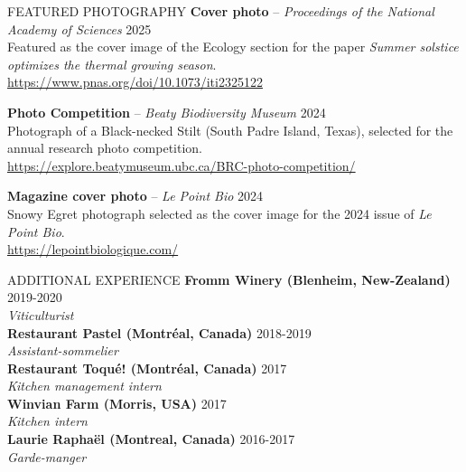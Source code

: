 \documentclass[
	11pt, %
]{resume} %
\begin{document}
\begin{rSection}{FEATURED PHOTOGRAPHY}
  \textbf{Cover photo} – \textit{Proceedings of the National Academy of Sciences} \hfill 2025 \\
  Featured as the cover image of the Ecology section for the paper \textit{Summer solstice optimizes the thermal growing season}.\\
  \href{https://www.pnas.org/doi/10.1073/iti2325122#sec-4}{https://www.pnas.org/doi/10.1073/iti2325122}

  \textbf{Photo Competition} – \textit{Beaty Biodiversity Museum} \hfill 2024 \\
  Photograph of a Black-necked Stilt (South Padre Island, Texas), selected for the annual research photo competition. \\
  \href{https://explore.beatymuseum.ubc.ca/BRC-photo-competition/25/entries/Christophe-Rouleu-Desrochers/}{https://explore.beatymuseum.ubc.ca/BRC-photo-competition/}

  \textbf{Magazine cover photo} – \textit{Le Point Bio} \hfill 2024 \\
  Snowy Egret photograph selected as the cover image for the 2024 issue of \textit{Le Point Bio}.\\
  \href{https://lepointbiologique.com/wp-content/uploads/2024/04/le_point_bio_2024_numerique.pdf}{https://lepointbiologique.com/}
\end{rSection}

\begin{rSection}{ADDITIONAL EXPERIENCE}
	\textbf{Fromm Winery (Blenheim, New-Zealand)} \hfill 2019-2020 \\ 
	\textit{Viticulturist} \\ 
	\textbf{Restaurant Pastel (Montréal, Canada)} \hfill 2018-2019 \\
	\textit{Assistant-sommelier} \\
	\textbf{Restaurant Toqué! (Montréal, Canada)} \hfill 2017 \\
	\textit{Kitchen management intern} \\
	\textbf{Winvian Farm (Morris, USA)} \hfill 2017 \\
	\textit{Kitchen intern}\\
	\textbf{Laurie Raphaël (Montreal, Canada)} \hfill 2016-2017 \\
	\textit{Garde-manger}
\end {rSection}
\end{document}

